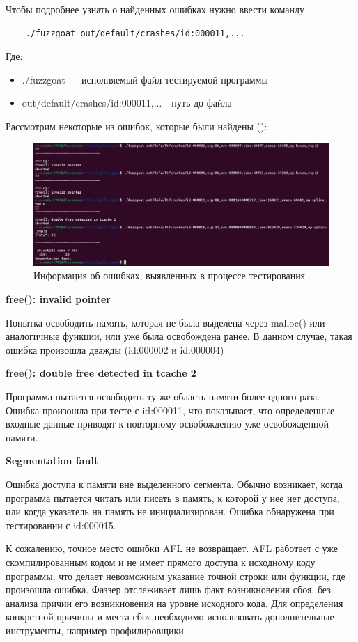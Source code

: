 Чтобы подробнее узнать о найденных ошибках нужно ввести команду
\begin{verbatim}
	./fuzzgoat out/default/crashes/id:000011,...
\end{verbatim}
Где:
\begin{itemize}
	\item ./fuzzgoat — исполняемый файл тестируемой программы
	\item out/default/crashes/id:000011,... - путь до файла
\end{itemize}

Рассмотрим некоторые из ошибок, которые были найдены ():
\begin{figure}[ht] 
	\center
	\includegraphics [scale=1] {my_folder/images/errors_concrete}
	\caption{Информация об ошибках, выявленных в процессе тестирования} 
	\label{fig:errors-concrete-ch4}  
\end{figure}

\textbf{free(): invalid pointer}

Попытка освободить память, которая не была выделена через malloc() или аналогичные функции, или уже была освобождена ранее. В данном случае, такая ошибка произошла дважды (id:000002 и id:000004)

\textbf{free(): double free detected in tcache 2}

Программа пытается освободить ту же область памяти более одного раза. 
Ошибка произошла при тесте с id:000011, что показывает, что определенные входные данные приводят к повторному освобождению уже освобожденной памяти.

\textbf{Segmentation fault}

Ошибка доступа к памяти вне выделенного сегмента. Обычно возникает, когда программа пытается читать или писать в память, к которой у нее нет доступа, или когда указатель на память не инициализирован.
Ошибка обнаружена при тестировании с id:000015.


К сожалению, точное место ошибки AFL не возвращает. AFL работает с уже скомпилированным кодом и не имеет прямого доступа к исходному коду программы, что делает невозможным указание точной строки или функции, где произошла ошибка. Фаззер отслеживает лишь факт возникновения сбоя, без анализа причин его возникновения на уровне исходного кода. Для определения конкретной причины и места сбоя необходимо использовать дополнительные инструменты, например профилировщики.

